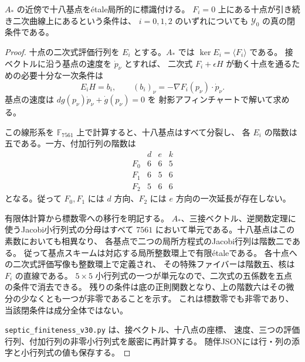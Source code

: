 \begin{lemma}[三つの二次曲線条件への非接性]
\label{lem:septic-conic-obstruction-v30}
$A_*$ の近傍で十八基点を\'etale局所的に標識付ける。
$F_i=0$ 上にある十点が引き続き二次曲線上にあるという条件は、
$i=0,1,2$ のいずれについても $\mathcal Y_0$ の真の閉条件である。
\end{lemma}
\begin{proof}
十点の二次式評価行列を $E_i$ とする。$A_*$ では
$\ker E_i=\langle F_i\rangle$ である。
接ベクトルに沿う基点の速度を $\dot p_\nu$ とすれば、
二次式 $F_i+\epsilon H$ が動く十点を通るための必要十分な一次条件は
\[
 E_i H=b_i,\qquad
 (b_i)_\nu=-\nabla F_i(p_\nu)\cdot\dot p_\nu.
\]
基点の速度は $dg(p_\nu)\dot p_\nu+\dot g(p_\nu)=0$ を
射影アフィンチャートで解いて求める。

この線形系を $\mathbb F_{7561}$ 上で計算すると、十八基点はすべて分裂し、
各 $E_i$ の階数は五である。一方、付加行列の階数は
\[
\begin{array}{c|ccc}
 &d&e&k\\\hline
 F_0&6&6&5\\
 F_1&6&5&6\\
 F_2&5&6&6
\end{array}
\]
となる。従って $F_0,F_1$ には $d$ 方向、$F_2$ には $e$ 方向の一次延長が存在しない。

有限体計算から標数零への移行を明記する。
$A_*$、三接ベクトル、逆関数定理に使うJacobi小行列式の分母はすべて
$7561$ において単元である。十八基点はこの素数においても相異なり、
各基点で二つの局所方程式のJacobi行列は階数二である。
従って基点スキームは対応する局所整数環上で有限\'etaleである。
各十点への二次式評価写像も整数環上で定義され、
その特殊ファイバーは階数五、核は $F_i$ の直線である。
$5\times5$ 小行列式の一つが単元なので、二次式の五係数を五点の条件で消去できる。
残りの条件は底の正則関数となり、上の階数六はその微分の少なくとも一つが非零であることを示す。
これは標数零でも非零であり、当該閉条件は成分全体ではない。

\nolinkurl{septic_finiteness_v30.py} は、接ベクトル、十八点の座標、
速度、三つの評価行列、付加行列の非零小行列式を厳密に再計算する。
随伴JSONには行・列の添字と小行列式の値も保存する。
\end{proof}

